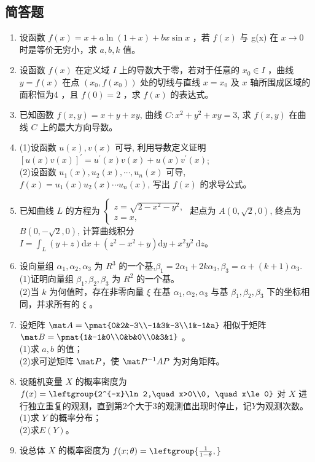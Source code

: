 \subsection{简答题}
\begin{enumerate}
\item 设函数 $f(x)=x+a\ln(1+x)+bx\sin x$ ，若 $f(x)$ 与 g(x) 在 $x \to 0$ 时是等价无穷小，求 $a,b,k$ 值。
\item  设函数 $f(x)$ 在定义域 $I$ 上的导数大于零，若对于任意的 $x_0 \in I$ ，曲线 $y=f(x)$ 在点 $(x_0,f(x_0))$ 处的切线与直线 $x=x_0$ 及 $x$ 轴所围成区域的面积恒为4 ，且 $f(0)=2$ ，求 $f(x)$ 的表达式。
\item  已知函数 $f(x, y)=x+y+x y$, 曲线 $C: x^2+y^2+x y=3$, 求 $f(x, y)$ 在曲线 $C$ 上的最大方向导数。
\item (1)设函数 $u(x), v(x)$ 可导, 利用导数定义证明 $[u(x) v(x)]^{\prime}=u^{\prime}(x) v(x)+u(x) v^{\prime}(x)$;\\
(2)设函数 $u_1(x), u_2(x), \cdots, u_n(x)$ 可导, $f(x)=u_1(x) u_2(x) \cdots u_n(x)$, 写出 $f(x)$ 的求导公式。
\item 已知曲线 $L$ 的方程为 $\left\{\begin{array}{l}z=\sqrt{2-x^2-y^2}, \\ z=x,\end{array}\right.$ 起点为 $A(0, \sqrt{2}, 0)$, 终点为 $B(0,-\sqrt{2}, 0)$, 计算曲线积分 $I=\int_L(y+z) \mathrm{d} x+\left(z^2-x^2+y\right) \mathrm{d} y+x^2 y^2 \mathrm{~d} z$。
\item  设向量组 $\alpha_1,\alpha_2,\alpha_3$ 为 $R^3$ 的一个基,$\beta_1=2\alpha_1+2k\alpha_3,\beta_3=\alpha+(k+1)\alpha_3$.\\
(1)证明向量组  $\beta_1,\beta_2,\beta_3$ 为 $R^2$ 的一个基。\\
(2)当 $k$ 为何值时，存在非零向量 $\xi$ 在基  $\alpha_1,\alpha_2,\alpha_3$ 与基  $\beta_1,\beta_2,\beta_3$ 下的坐标相同，并求所有的 $\xi$ 。
\item 设矩阵 $\mat A=\pmat{0&2&-3\\-1&3&-3\\1&-1&a}$ 相似于矩阵 $\mat B=\pmat{1&-1&0\\0&b&0\\0&3&1}$ 。\\
(1)求 $a,b$ 的值；\\
(2)求可逆矩阵 $\mat P$，使 $\mat P^{-1}AP$  为对角矩阵。
\item 设随机变量 $X$ 的概率密度为 $f(x)=\leftgroup{2^{-x}\ln 2,\quad x>0\\0, \quad  x\le 0}$ 对 $X$ 进行独立重复的观测，直到第2个大于3的观测值出现时停止，记$Y$为观测次数。\\
(1)求 $Y$ 的概率分布；\\
(2)求$E(Y)$。
\item 设总体 $X$ 的概率密度为 $f(x;\theta)=\leftgroup{\frac{1}{1-\theta},}$

\end{enumerate}
